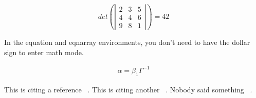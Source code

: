 \begin{equation}
det\left(\left|\begin{array}{ccc} 2 & 3 & 5\\
4 & 4 & 6\\
9 & 8 & 1
\end{array}\right|\right) = 42
\end{equation}

In the equation and eqnarray environments, you don't need to have the dollar sign to enter math mode.

\begin{eqnarray}
\alpha = \beta_1 \Gamma^{-1}
\end{eqnarray}

This is citing a reference ~\cite{mygood11111}.  This is citing another ~\cite{mrx05}.  Nobody said something ~\cite{Nobody06}.
